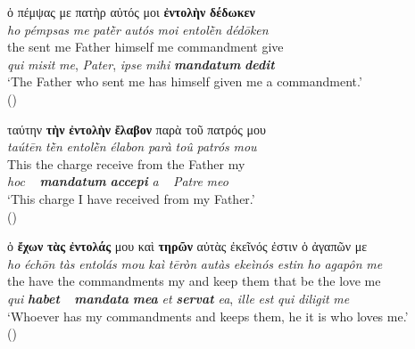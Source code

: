 \documentclass[output=paper,colorlinks,citecolor=brown]{langscibook}
\begin{document}
\ex\label{ex:bj:7b}

\gllll  ὁ πέμψας με πατὴρ αὐτός μοι \textbf{ἐντολὴν} \textbf{δέδωκεν}\\
 \textit{ho} \textit{pémpsas} \textit{me} \textit{patḕr} \textit{autós} \textit{moi} \textit{entolḕn} \textit{dédōken}\\
the sent me Father himself me commandment give\\
\emph{qui} \emph{misit} \emph{me}, \emph{Pater}, \emph{ipse} \emph{mihi} \textbf{\itshape mandatum} \textbf{\itshape dedit}\\
\glt `The Father who sent me has himself given me a commandment.' \\
\hspace*{\fill}()

\ex\label{ex:bj:7c}

\gllll ταύτην \textbf{τὴν} \textbf{ἐντολὴν} \textbf{ἔλαβον} παρὰ τοῦ πατρός μου\\
 \textit{taútēn} \textit{tḕn} \textit{entolḕn} \textit{élabon} \textit{parà} \textit{toû} \textit{patrós} \textit{mou}\\
This the charge receive from the Father my\\
\emph{hoc} ~ \textbf{\itshape mandatum} \textbf{\itshape accepi} \emph{a} ~ \emph{Patre} \emph{meo}\\
\glt `This charge I have received from my Father.' \\
\hspace*{\fill}()

\ex\label{ex:bj:7d}

\gllll ὁ \textbf{ἔχων} \textbf{τὰς} \textbf{ἐντολάς} μου καὶ \textbf{τηρῶν} αὐτὰς ἐκεῖνός ἐστιν ὁ ἀγαπῶν με\\
 \textit{ho} \textit{échōn} \textit{tàs} \textit{entolás} \textit{mou} \textit{kaì} \textit{tēròn} \textit{autàs} \textit{ekeìnós} \textit{estin} \textit{ho} \textit{agapôn} \textit{me}\\
the have the commandments my and keep them that be the love me\\
\emph{qui} \textbf{\itshape habet} ~ \textbf{\itshape mandata} \textbf{\itshape mea}
\emph{et} \textbf{\itshape servat} \emph{ea}, \emph{ille} \emph{est} \emph{qui} \emph{diligit} \emph{me}\\
\glt `Whoever has my commandments and keeps them, he it is who loves me.' \\
\hspace*{\fill}()
\end{document}

